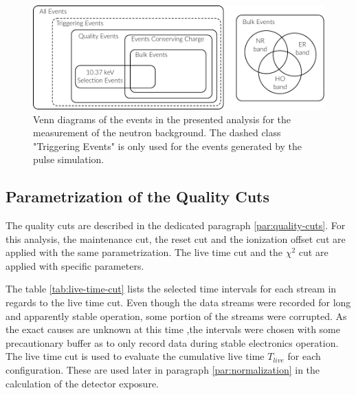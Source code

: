 
\begin{figure}
\centering
\includegraphics[scale=1]{Figures/Neutron/cut_venn_diagramm.pdf}
\caption{Venn diagrams of the events in the presented analysis for the measurement of the neutron background. The dashed class "Triggering Events" is only used for the events generated by the pulse simulation.}
\label{fig:cut-venn-diagramm}
\end{figure}


\subsection{Parametrization of the Quality Cuts}
\label{par:param-quality-cuts}

The quality cuts are described in the dedicated paragraph \ref{par:quality-cuts}. For this analysis, the maintenance cut, the reset cut and the ionization offset cut are applied with the same parametrization.
The live time cut and the $\chi^2$ cut are applied with specific parameters. 

The table \ref{tab:live-time-cut} lists the selected time intervals for each stream in regards to the live time cut. Even though the data streams were recorded for long and apparently stable operation, some portion of the streams were corrupted. As the exact causes are unknown at this time ,the intervals were chosen with some precautionary buffer as to only record data during stable electronics operation.
The live time cut is used to evaluate the cumulative live time $T_{live}$ for each configuration. These are used later in paragraph \ref{par:normalization} in the calculation of the detector exposure.

